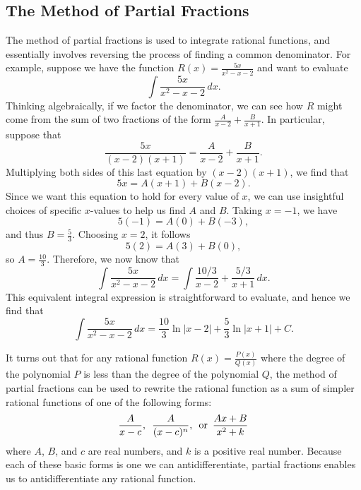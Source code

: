 \subsection*{The Method of Partial Fractions} 

The method of partial fractions is used to integrate rational functions, and essentially involves reversing the process of finding a common denominator.  For example, suppose we have the function $R(x) = \frac{5x}{x^2 - x - 2}$ and want to evaluate
$$\int \frac{5x}{x^2-x-2} \, dx.$$
Thinking algebraically, if we factor the denominator, we can see how $R$ might come from the sum of two fractions of the form $\frac{A}{x-2} + \frac{B}{x+1}.$  In particular, suppose that
$$\frac{5x}{(x-2)(x+1)} = \frac{A}{x-2} + \frac{B}{x+1}.$$
Multiplying both sides of this last equation by $(x-2)(x+1)$, we find that
$$5x = A(x+1) + B(x-2).$$
Since we want this equation to hold for every value of $x$, we can use insightful choices of specific $x$-values to help us find $A$ and $B$.  Taking $x = -1$, we have
$$5(-1) = A(0) + B(-3),$$
and thus $B = \frac{5}{3}$.  Choosing $x = 2$, it follows
$$5(2) = A(3) + B(0),$$
so $A = \frac{10}{3}.$
Therefore, we now know that 
$$\int \frac{5x}{x^2-x-2} \, dx = \int \frac{10/3}{x-2} + \frac{5/3}{x+1} \, dx.$$
This equivalent integral expression is straightforward to evaluate, and hence we find that
$$\int \frac{5x}{x^2-x-2} \, dx = \frac{10}{3} \ln|x-2| + \frac{5}{3}\ln|x+1| + C.$$

It turns out that for any rational function $R(x) = \frac{P(x)}{Q(x)}$ where the degree of the polynomial $P$ is less than the degree of the polynomial $Q$, the method of partial fractions can be used to rewrite the rational function as a sum of simpler rational functions of one of the following forms:
$$\frac{A}{x-c}, \enskip \frac{A}{(x-c)^n}, \enskip \mbox{or} \enskip \frac{Ax+B}{x^2 + k}$$
where $A$, $B$, and $c$ are real numbers, and $k$ is a positive real number.  Because each of these basic forms is one we can antidifferentiate, partial fractions enables us to antidifferentiate any rational function.


